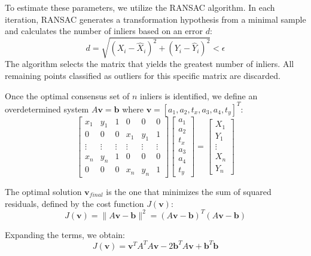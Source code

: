 \documentclass[conference]{IEEEtran}
\begin{document}
To estimate these parameters, we utilize the RANSAC algorithm. In each iteration, RANSAC generates a transformation hypothesis from a minimal sample and calculates the number of inliers based on an error $d$:
\begin{equation}
d = \sqrt{(X_i - \hat{X}_i)^2 + (Y_i - \hat{Y}_i)^2} < \epsilon
\end{equation}
The algorithm selects the matrix that yields the greatest number of inliers. All remaining points classified as outliers for this specific matrix are discarded.

Once the optimal consensus set of $n$ inliers is identified, we define an overdetermined system $A\mathbf{v} = \mathbf{b}$ where $\mathbf{v} = [a_1, a_2, t_x, a_3, a_4, t_y]^T$:
\begin{equation}
\begin{bmatrix} 
x_1 & y_1 & 1 & 0 & 0 & 0 \\ 
0 & 0 & 0 & x_1 & y_1 & 1 \\ 
\vdots & \vdots & \vdots & \vdots & \vdots & \vdots \\ 
x_n & y_n & 1 & 0 & 0 & 0 \\ 
0 & 0 & 0 & x_n & y_n & 1 
\end{bmatrix} 
\begin{bmatrix} a_1 \\ a_2 \\ t_x \\ a_3 \\ a_4 \\ t_y \end{bmatrix} = 
\begin{bmatrix} X_1 \\ Y_1 \\ \vdots \\ X_n \\ Y_n \end{bmatrix}
\end{equation}

The optimal solution $\mathbf{v}_{final}$ is the one that minimizes the sum of squared residuals, defined by the cost function $J(\mathbf{v})$:
\begin{equation}
J(\mathbf{v}) = \|A\mathbf{v} - \mathbf{b}\|^2 = (A\mathbf{v} - \mathbf{b})^T(A\mathbf{v} - \mathbf{b})
\end{equation}

Expanding the terms, we obtain:
\begin{equation}
J(\mathbf{v}) = \mathbf{v}^T A^T A \mathbf{v} - 2\mathbf{b}^T A \mathbf{v} + \mathbf{b}^T \mathbf{b}
\end{equation}
\end{document}
